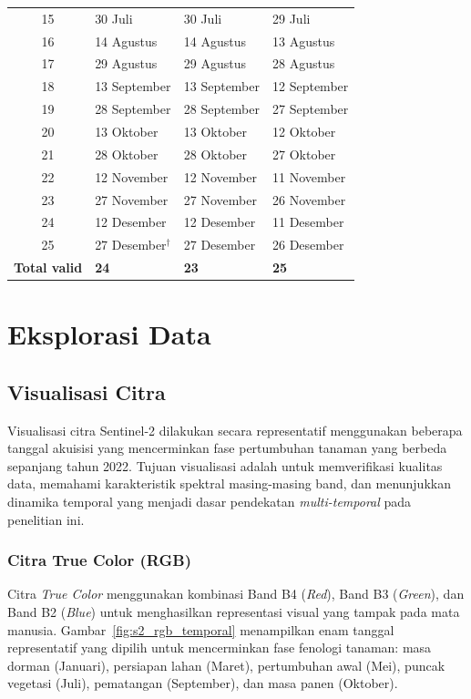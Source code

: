 \begin{center}
\begin{longtable}{clll}
15 & 30 Juli     & 30 Juli     & 29 Juli     \\
16 & 14 Agustus  & 14 Agustus  & 13 Agustus  \\
17 & 29 Agustus  & 29 Agustus  & 28 Agustus  \\
18 & 13 September & 13 September & 12 September \\
19 & 28 September & 28 September & 27 September \\
20 & 13 Oktober  & 13 Oktober  & 12 Oktober  \\
21 & 28 Oktober  & 28 Oktober  & 27 Oktober  \\
22 & 12 November & 12 November & 11 November \\
23 & 27 November & 27 November & 26 November \\
24 & 12 Desember & 12 Desember & 11 Desember \\
25 & 27 Desember$^\dagger$ & 27 Desember & 26 Desember \\
\hline
\textbf{Total valid} & \textbf{24} & \textbf{23} & \textbf{25} \\
\end{longtable}
\end{center}

\section{Eksplorasi Data}
\subsection{Visualisasi Citra}
Visualisasi citra Sentinel-2 dilakukan secara representatif menggunakan beberapa tanggal akuisisi yang mencerminkan fase pertumbuhan tanaman yang berbeda sepanjang tahun 2022.
Tujuan visualisasi adalah untuk memverifikasi kualitas data, memahami karakteristik spektral masing-masing band, dan menunjukkan dinamika temporal yang menjadi dasar pendekatan \textit{multi-temporal} pada penelitian ini.

\subsubsection{Citra True Color (RGB)}
Citra \textit{True Color} menggunakan kombinasi Band B4 (\textit{Red}), Band B3 (\textit{Green}), dan Band B2 (\textit{Blue}) untuk menghasilkan representasi visual yang tampak pada mata manusia.
Gambar~\ref{fig:s2_rgb_temporal} menampilkan enam tanggal representatif yang dipilih untuk mencerminkan fase fenologi tanaman: masa dorman (Januari), persiapan lahan (Maret), pertumbuhan awal (Mei), puncak vegetasi (Juli), pematangan (September), dan masa panen (Oktober).

